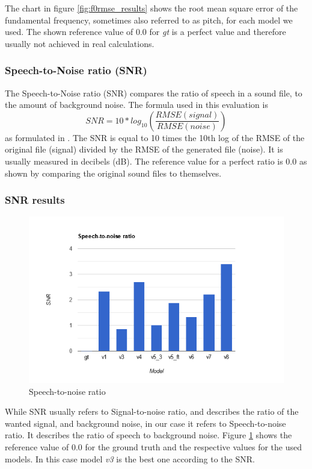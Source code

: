\documentclass[a4paper]{article}
\begin{document}
The chart in figure \ref{fig:f0rmse_results} shows the root mean square error of
the fundamental frequency, sometimes also referred to as pitch, for each model
we used. The shown reference value of 0.0 for \emph{gt} is a perfect value and
therefore usually not achieved in real calculations.

\subsubsection{Speech-to-Noise ratio (SNR)}
The Speech-to-Noise ratio (SNR) compares the ratio of speech in a sound file, to
the amount of background noise. The formula used in this evaluation is \\
\[
    SNR = 10*log_{10} (\frac{RMSE(signal)}{RMSE(noise)})
\]
as formulated in \cite{ji2020comprehensivesurveydeepmusic}. The SNR is equal to 10 times the 10th log of the RMSE of
the original file (signal) divided by the RMSE of the generated file (noise). It
is usually measured in decibels (dB). The reference value for a perfect ratio is
0.0 as shown by comparing the original sound files to themselves.

\subsubsection{SNR results}
\begin{figure}[hbtp]
    \includegraphics[width=\textwidth]{evaluation/graphs/SNR.png}
    \caption{Speech-to-noise ratio}
    \label{fig:snr}
\end{figure}

While SNR usually refers to Signal-to-noise ratio, and describes the ratio of
the wanted signal, and background noise, in our case it refers to
Speech-to-noise ratio. It describes the ratio of speech to background noise.
Figure \ref{fig:snr} shows the reference value of 0.0 for the ground truth and
the respective values for the used models. In this case model \emph{v3} is the
best one according to the SNR.
\end{document}

